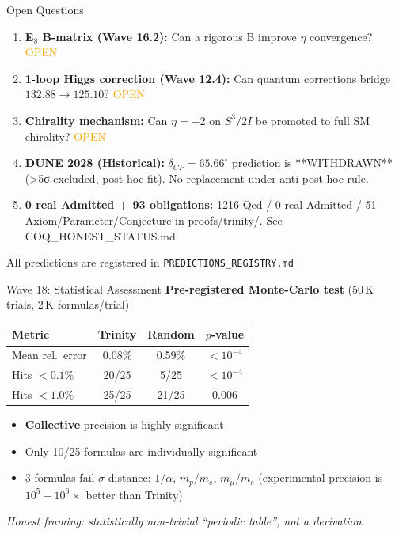 \documentclass[aspectratio=169,11pt]{beamer}
\begin{document}
\begin{frame}{Open Questions}
  \begin{enumerate}
    \item \textbf{E$_8$ B-matrix (Wave 16.2):} Can a rigorous B improve $\eta$ convergence? \textcolor{orange}{OPEN}
    \item \textbf{1-loop Higgs correction (Wave 12.4):} Can quantum corrections bridge $132.88 \to 125.10$? \textcolor{orange}{OPEN}
    \item \textbf{Chirality mechanism:} Can $\eta = -2$ on $S^3/2I$ be promoted to full SM chirality? \textcolor{orange}{OPEN}
    \item \textbf{DUNE 2028 (Historical):} $\delta_{CP} = 65.66^\circ$ prediction is **WITHDRAWN** (>5σ excluded, post-hoc fit). No replacement under anti-post-hoc rule.
    \item \textbf{0 real Admitted + 93 obligations:} 1216 Qed / 0 real Admitted / 51 Axiom/Parameter/Conjecture in proofs/trinity/. See COQ_HONEST_STATUS.md.
  \end{enumerate}
  \vfill
  \begin{center}
    \small All predictions are registered in \texttt{PREDICTIONS\_REGISTRY.md}
  \end{center}
\end{frame}

\begin{frame}{Wave 18: Statistical Assessment}
  \textbf{Pre-registered Monte-Carlo test} (50\,K trials, 2\,K formulas/trial)
  \vspace{0.3cm}
  \begin{tabular}{lccc}
    \textbf{Metric} & \textbf{Trinity} & \textbf{Random} & \textbf{$p$-value} \\
    \hline
    Mean rel.\ error & 0.08\% & 0.59\% & \textcolor{green!60!black}{$<10^{-4}$} \\
    Hits $<0.1\%$ & 20/25 & 5/25 & \textcolor{green!60!black}{$<10^{-4}$} \\
    Hits $<1.0\%$ & 25/25 & 21/25 & \textcolor{green!60!black}{0.006} \\
  \end{tabular}
  \vspace{0.3cm}
  \begin{itemize}
    \item \textbf{Collective} precision is highly significant
    \item Only 10/25 formulas are individually significant
    \item 3 formulas fail $\sigma$-distance: $1/\alpha$, $m_p/m_e$, $m_\mu/m_e$
      (experimental precision is $10^5\!\!-\!\!10^6\times$ better than Trinity)
  \end{itemize}
  \vspace{0.2cm}
  \footnotesize
  \textit{Honest framing: statistically non-trivial ``periodic table'', not a derivation.}
\end{frame}
\end{document}
